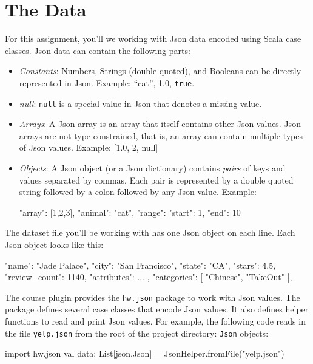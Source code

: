 \documentclass[9pt]{extbook}
\begin{document}
\section{The Data}
For this assignment, you'll we working with Json data encoded using Scala case
classes. Json data can contain the following parts:
\begin{itemize}
    \item \textit{Constants}: Numbers, Strings (double quoted), and Booleans
    can be directly represented in Json. Example: ``cat'', 1.0, \texttt{true}.

    \item \textit{null}: \texttt{null} is a special value in Json that
    denotes a missing value.

    \item \textit{Arrays}: A Json array is an array that itself contains other
    Json values. Json arrays are not type-constrained, that is, an array can
    contain multiple types of Json values. Example: [1.0, 2, null]

    \item \textit{Objects}: A Json object (or a Json dictionary) contains
    \textit{pairs} of keys and values separated by commas. Each pair is
    represented by a double quoted string followed by a colon followed by any
    Json value. Example:
    \begin{scalacode}
    {
        "array": [1,2,3],
        "animal": "cat",
        "range": { "start": 1, "end": 10 }
    }
    \end{scalacode}
\end{itemize}

The dataset file you'll be working with has one Json object on each line. Each
Json object looks like this:
    \begin{scalacode}
    {
        "name": "Jade Palace",
        "city": "San Francisco",
        "state": "CA",
        "stars": 4.5,
        "review_count": 1140,
        "attributes": { ... },
        "categories": [ "Chinese", "TakeOut" ],
    }
    \end{scalacode}
The course plugin provides the \lstinline|hw.json| package to work with Json
values. The package defines several case classes that encode Json values. It
also defines helper functions to read and print Json values. For example,
the following code reads in the file \texttt{yelp.json} from the root of the
project directory:
\texttt{Json} objects:
\begin{scalacode}
import hw.json
val data: List[json.Json] = JsonHelper.fromFile("yelp.json")
\end{scalacode}
\end{document}
